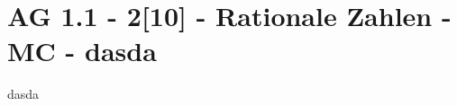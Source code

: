 \section{AG 1.1 - 2[10] - Rationale Zahlen - MC - dasda}

\begin{beispiel}[AG 1.1]{1}
dasda
\end{beispiel}